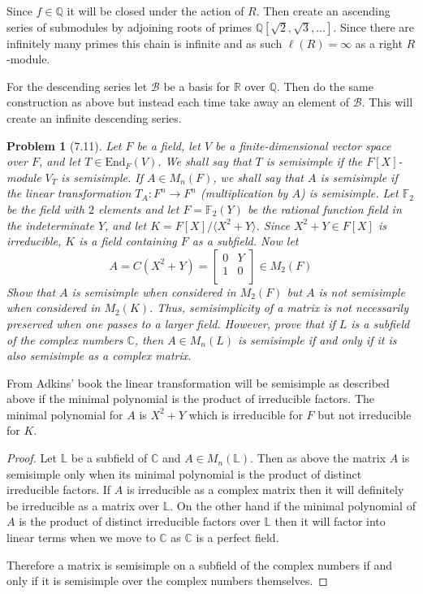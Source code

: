 \documentclass[10pt]{article}
\newcommand{\sk}{\vskip 10mm}
\newcommand{\bb}[1]{\mathbb{#1}}
\theoremstyle{plain}
\newtheorem{problem}{Problem}
\theoremstyle{remark}
\begin{document}
Since $f\in\bb{Q}$ it will be closed under the action of $R$.
Then create an ascending series of submodules by
adjoining roots of primes $\bb{Q}[\sqrt{2},\sqrt{3},\ldots]$.
Since there are infinitely many primes this chain is infinite
and as such $\ell(R)=\infty$ as a right $R$-module.

For the descending series let $\mathcal{B}$ be a basis for $\bb{R}$ over
$\bb{Q}$. Then do the same construction as above but instead each
time take away an element of $\mathcal{B}$. This will create an
infinite descending series.

\sk

\begin{problem}[7.11]
  Let $F$ be a field, let $V$ be a finite-dimensional vector space over $F$,
  and let $T\in \text{End}_F(V)$. We shall say that $T$ is semisimple if the
  $F[X]$-module $V_T$ is semisimple. If $A\in M_n(F)$, we shall say that $A$
  is semisimple if the linear transformation $T_A: F^n\rightarrow F^n$
  (multiplication by $A$) is semisimple. Let $\bb{F}_2$ be the field with
  $2$ elements and let $F=\bb{F}_2(Y)$ be the rational function field in
  the indeterminate $Y$, and let $K=F[X]/\langle X^2+Y\rangle$. Since
  $X^2+Y\in F[X]$ is irreducible, $K$ is a field containing
  $F$ as a subfield. Now let
  \[
    A=C(X^2+Y)=
    \left[
      \begin{array}{cc}
        0&Y\\
        1&0\\
      \end{array}
    \right]
    \in M_2(F)
  \]
  Show that $A$ is semisimple when considered in $M_2(F)$ but $A$ is not
  semisimple when considered in $M_2(K)$. Thus, semisimplicity of a matrix
  is not necessarily preserved when one passes to a larger field. However,
  prove that if $L$ is a subfield of the complex numbers $\bb{C}$, then
  $A\in M_n(L)$ is semisimple if and only if it is also semisimple as a complex
  matrix.
\end{problem}

From Adkins' book the linear transformation will be semisimple as
described above if the minimal polynomial is the product of irreducible
factors. The minimal polynomial for $A$ is $X^2+Y$ which is irreducible
for $F$ but not irreducible for $K$.

\begin{proof}
  Let $\bb{L}$ be a subfield of $\bb{C}$ and $A\in M_n(\bb{L})$. Then as
  above the matrix $A$ is semisimple only when its minimal polynomial
  is the product of distinct irreducible factors. If $A$ is irreducible as
  a complex matrix then it will definitely be irreducible as a matrix
  over $\bb{L}$. On the other hand if the minimal polynomial of $A$
  is the product of distinct irreducible factors over $\bb{L}$ then it
  will factor into linear terms when we move to $\bb{C}$ as $\bb{C}$ is
  a perfect field.

  Therefore a matrix is semisimple on a subfield of the complex numbers
  if and only if it is semisimple over the complex numbers themselves.
\end{proof}
\end{document}
